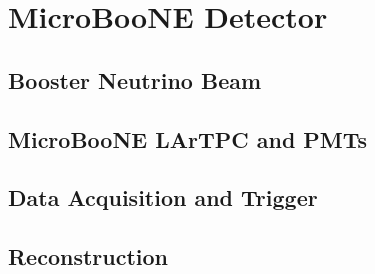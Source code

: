 \section{MicroBooNE Detector}\label{microboone}

\subsection{Booster Neutrino Beam}
\subsection{MicroBooNE LArTPC and PMTs}
\subsection{Data Acquisition and Trigger}
\subsection{Reconstruction}

